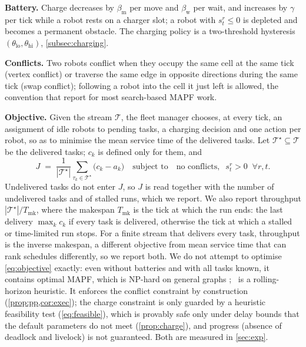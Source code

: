 \noindent\textbf{Battery.}
Charge decreases by $\beta_{\mathrm{m}}$ per move and $\beta_{\mathrm{w}}$ per
wait, and increases by $\gamma$ per tick while a robot rests on a charger
slot; a robot with $s^r_t\le 0$ is depleted and becomes a permanent
obstacle. The charging policy is a two-threshold hysteresis
$(\theta_{\mathrm{lo}},\theta_{\mathrm{hi}})$, \cref{subsec:charging}.

\noindent\textbf{Conflicts.}
Two robots conflict when they occupy the same cell at the same tick (vertex
conflict) or traverse the same edge in opposite directions during the same
tick (swap conflict); following a robot into the cell it just left is
allowed, the convention that \citet{stern2019mapf} report for most
search-based MAPF work.

\noindent\textbf{Objective.}
Given the stream $\mathcal{T}$, the fleet manager chooses, at every tick, an
assignment of idle robots to pending tasks, a charging decision and one action
per robot, so as to minimise the mean service time of the delivered tasks.
Let $\mathcal{T}^{\star}\subseteq\mathcal{T}$ be the delivered tasks; $c_k$ is
defined only for them, and
\begin{equation}\label{eq:objective}
  J \;=\; \frac{1}{|\mathcal{T}^{\star}|}\sum_{\tau_k\in\mathcal{T}^{\star}} \bigl(c_k - a_k\bigr)
  \quad\text{subject to}\quad
  \text{no conflicts},\;\; s^r_t>0\;\;\forall r,t.
\end{equation}
Undelivered tasks do not enter $J$, so $J$ is read together with the number of
undelivered tasks and of stalled runs, which we report. We also report
throughput $|\mathcal{T}^{\star}|/T_{\mathrm{mk}}$, where the makespan
$T_{\mathrm{mk}}$ is the tick at which the run ends: the last delivery
$\max_k c_k$ if every task is delivered, otherwise the tick at which a stalled or time-limited run stops.
For a finite stream that delivers every task, throughput is the
inverse makespan, a different objective from mean service time that can rank
schedules differently, so we report both. We do not attempt to optimise \cref{eq:objective} exactly: even
without batteries and with all tasks known, it contains optimal MAPF, which is NP-hard on general
graphs \citep{yu2013structure}; \sname\ is a rolling-horizon
heuristic. It enforces the conflict constraint by construction
(\cref{prop:pp,cor:exec}); the charge constraint is only guarded by a
heuristic feasibility test (\cref{eq:feasible}), which is provably safe only
under delay bounds that the default parameters do not meet
(\cref{prop:charge}), and progress (absence of deadlock and livelock) is not
guaranteed. Both are measured in \cref{sec:exp}.

